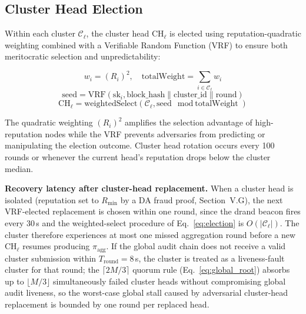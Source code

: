 \documentclass[journal]{IEEEtran}
\begin{document}
\subsection{Cluster Head Election}

Within each cluster $\mathcal{C}_\ell$, the cluster head $\text{CH}_\ell$ is elected using reputation-quadratic weighting combined with a Verifiable Random Function (VRF) to ensure both meritocratic selection and unpredictability:

\begin{equation}
w_i = (R_i)^2, \quad \text{totalWeight} = \sum_{i \in \mathcal{C}_\ell} w_i
\label{eq:weight}
\end{equation}
\begin{equation}
\text{seed} = \text{VRF}(\text{sk}_i, \text{block\_hash} \| \text{cluster\_id} \| \text{round})
\label{eq:vrf}
\end{equation}
\begin{equation}
\text{CH}_\ell = \text{weightedSelect}(\mathcal{C}_\ell, \text{seed} \mod \text{totalWeight})
\label{eq:election}
\end{equation}

The quadratic weighting $(R_i)^2$ amplifies the selection advantage of high-reputation nodes while the VRF prevents adversaries from predicting or manipulating the election outcome. Cluster head rotation occurs every 100 rounds or whenever the current head's reputation drops below the cluster median.

\textbf{Recovery latency after cluster-head replacement.} When a cluster head is isolated (reputation set to $R_{\min}$ by a DA fraud proof, Section~V.G), the next VRF-elected replacement is chosen within one round, since the drand beacon fires every $30\,$s and the weighted-select procedure of Eq.~\ref{eq:election} is $O(|\mathcal{C}_\ell|)$. The cluster therefore experiences at most one missed aggregation round before a new $\text{CH}_\ell$ resumes producing $\pi_{\text{agg}}$. If the global audit chain does not receive a valid cluster submission within $T_{\mathrm{round}}=8\,$s, the cluster is treated as a liveness-fault cluster for that round; the $\lceil 2M/3\rceil$ quorum rule (Eq.~\ref{eq:global_root}) absorbs up to $\lfloor M/3 \rfloor$ simultaneously failed cluster heads without compromising global audit liveness, so the worst-case global stall caused by adversarial cluster-head replacement is bounded by one round per replaced head.
\end{document}

